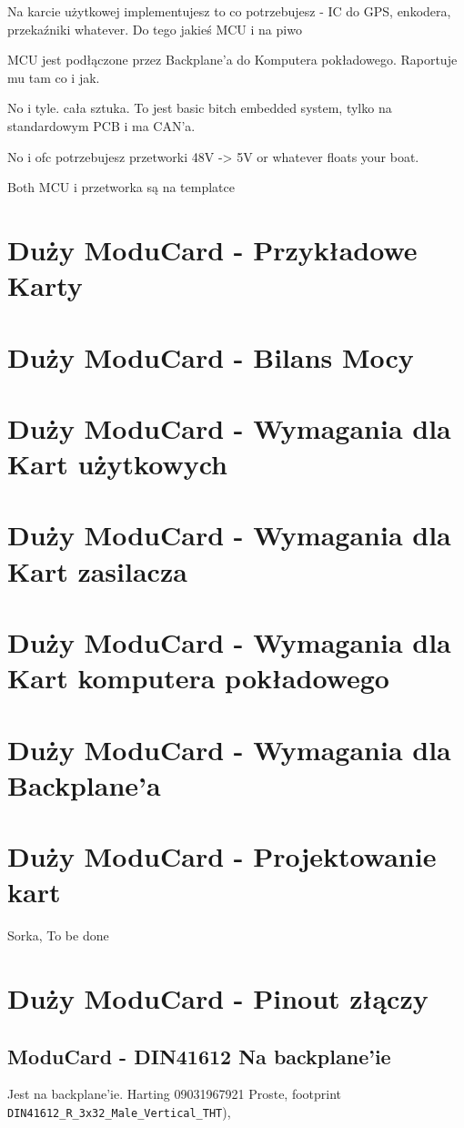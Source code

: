 \documentclass[b5paper, 10pt, twoside]{book}
\begin{document}
Na karcie użytkowej implementujesz to co potrzebujesz - IC do GPS, enkodera, przekaźniki whatever. Do tego jakieś MCU i na piwo

MCU jest podłączone przez Backplane'a do Komputera pokładowego. Raportuje mu tam co i jak.

No i tyle. cała sztuka. To jest basic bitch embedded system, tylko na standardowym PCB i ma CAN'a.

No i ofc potrzebujesz przetworki 48V -> 5V or whatever floats your boat.

Both MCU i przetworka są na templatce

\section{Duży ModuCard - Przykładowe Karty}
\section{Duży ModuCard - Bilans Mocy}\label{Duży ModuCard - Bilans Mocy}
\section{Duży ModuCard - Wymagania dla Kart użytkowych}
\section{Duży ModuCard - Wymagania dla Kart zasilacza}
\section{Duży ModuCard - Wymagania dla Kart komputera pokładowego}
\section{Duży ModuCard - Wymagania dla Backplane'a}
\section{Duży ModuCard - Projektowanie kart} \label{Duży ModuCard - Projektowanie kart}
Sorka, To be done
\section{Duży ModuCard - Pinout złączy}
\subsection{ModuCard - DIN41612 Na backplane'ie}
Jest na backplane'ie. Harting 09031967921 Proste, footprint \texttt{DIN41612\_R\_3x32\_Male\_Vertical\_THT}),
\end{document}
